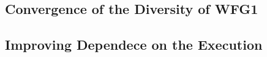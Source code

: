 \subsection{Convergence of the Diversity of WFG1}

\begin{figure}[t]
\centering

\label{fig:Diversity}
\end{figure}


\subsection{Improving Dependece on the Execution}










